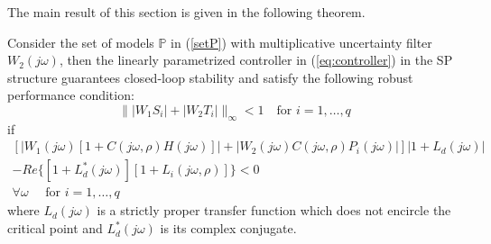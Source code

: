 \documentclass[default]{svmult}
\begin{document}
The main result of this section is given in the following theorem.
\begin{theorem}\label{th:siso}
Consider the  set of models $\mathbb{P}$  in (\ref{setP}) with multiplicative uncertainty filter $W_{2}(j\omega)$, then the linearly parametrized controller in (\ref{eq:controller}) in the SP structure guarantees closed-loop stability and satisfy the following robust performance condition:
\begin{equation} \label{RobPer}
\| |W_{1}S_i| + |W_{2}T_i|  \|_{\infty}<1\quad \mbox{for }i=1,\ldots,q  
\end{equation}
if
\begin{multline} \label{eq:cond_theorem1}
\left[\big|W_{1}(j\omega)[1+C(j\omega,\rho)H(j\omega)] \big | \right.+ 
\left.\big | W_{2}(j\omega)C(j\omega,\rho)P_i(j\omega) \big | \right] |1+L_d(j\omega)|  \\
- Re\{[1+L^{\ast}_d(j\omega)][1+L_i(j\omega,\rho)]\}<0 \\  \forall \omega \quad \mbox{ for }i=1,\ldots,q
\end{multline}
where $L_d(j\omega)$ is a strictly proper transfer function which does not encircle the critical point and $L_d^*(j\omega)$ is its complex conjugate. 
\end{theorem}
\end{document}
